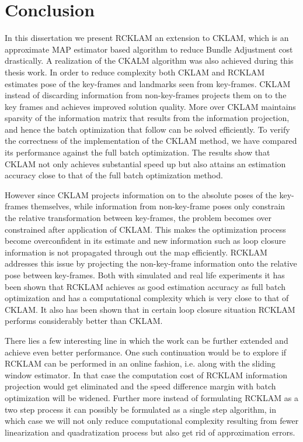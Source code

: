 \chapter{Conclusion}
\label{sec:conclusion}
In this dissertation we present RCKLAM an extension to CKLAM, which is an approximate MAP estimator based algorithm to reduce Bundle Adjustment cost drastically. A realization of the CKALM algorithm was also achieved during this thesis work. In order to reduce complexity both CKLAM and RCKLAM estimates pose of the key-frames and landmarks seen from key-frames. CKLAM instead of discarding information from non-key-frames projects them on to the key frames and achieves improved solution quality. More over CKLAM maintains sparsity of the information matrix that results from the information projection, and hence the batch optimization that follow can be solved efficiently. To verify the correctness of the implementation of the CKLAM method, we have compared its performance against the full batch optimization. The results show that CKLAM not only achieves substantial speed up but also attains an estimation accuracy close to that of the full batch optimization method.

However since CKLAM projects information on to the absolute poses of the key-frames themselves, while information from non-key-frame poses only constrain the relative transformation between key-frames, the problem becomes over constrained after application of CKLAM. This makes the optimization process become overconfident in its estimate and new information such as loop closure information is not propagated through out the map efficiently. RCKLAM addresses this issue by projecting the non-key-frame information onto the relative pose between key-frames. Both with simulated and real life experiments it has been shown that RCKLAM achieves as good estimation accuracy as full batch optimization and has a computational complexity which is very close to that of CKLAM. It also has been shown that in certain loop closure situation RCKLAM performs considerably better than CKLAM.

There lies a few interesting line in which the work can be further extended and achieve even better performance. One such continuation would be to explore if RCKLAM can be performed in an online fashion, i.e. along with the sliding window estimator. In that case the computation cost of RCKLAM information projection would get eliminated and the speed difference margin with batch optimization will be widened. Further more instead of formulating RCKLAM as a two step process it can possibly be formulated as a single step algorithm, in which case we will not only reduce computational complexity resulting from fewer linearization and quadratization process but also get rid of approximation errors.